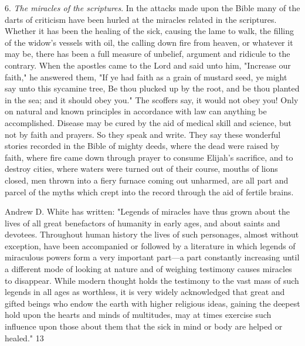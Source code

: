 6. \textit{The miracles of the scriptures}. In the attacks made upon the Bible many of the darts of
criticism have been hurled at the miracles related in the scriptures. Whether it has been the
healing of the sick, causing the lame to walk, the filling of the widow's vessels with oil, the
calling down fire from heaven, or whatever it may be, there has been a full measure of
unbelief, argument and ridicule to the contrary. When the apostles came to the Lord and said
unto him, "Increase our faith," he answered them, "If ye had faith as a grain of mustard seed,
ye might say unto this sycamine tree, Be thou plucked up by the root, and be thou planted in
the sea; and it should obey you." The scoffers say, it would not obey you! Only on natural
and known principles in accordance with law can anything be accomplished. Disease may be
cured by the aid of medical skill and science, but not by faith and prayers. So they speak and
write. They say these wonderful stories recorded in the Bible of mighty deeds, where the
dead were raised by faith, where fire came down through prayer to consume Elijah's
sacrifice, and to destroy cities, where waters were turned out of their course, mouths of lions
closed, men thrown into a fiery furnace coming out unharmed, are all part and parcel of the
myths which crept into the record through the aid of fertile brains.

Andrew D. White has written: "Legends of miracles have thus grown about the lives of all
great benefactors of humanity in early ages, and about saints and devotees. Throughout
human history the lives of such personages, almost without exception, have been
accompanied or followed by a literature in which legends of miraculous powers form a very
important part—a part constantly increasing until a different mode of looking at nature and of
weighing testimony causes miracles to disappear. While modern thought holds the testimony
to the vast mass of such legends in all ages as worthless, it is very widely acknowledged that
great and gifted beings who endow the earth with higher religious ideas, gaining the deepest
hold upon the hearts and minds of multitudes, may at times exercise such influence upon
those about them that the sick in mind or body are helped or healed." 13

